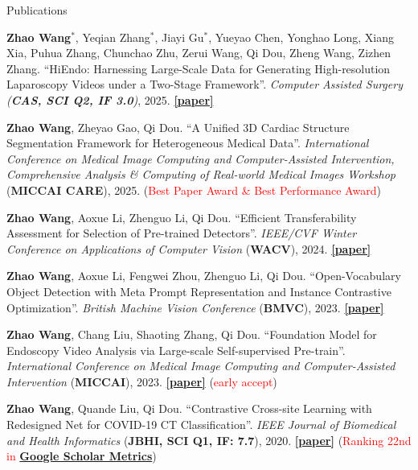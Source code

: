 \documentclass[a4paper]{resume} %
\newcommand{\hl}[1]{\textcolor{red}{#1}}
\begin{document}
\begin{rSection}{Publications}
\begin{enumerate}[label={[\arabic*]}, topsep=0em, leftmargin=1.4em, itemsep=-0.5em]
\item {\bf Zhao Wang}$^*$, Yeqian Zhang$^*$, Jiayi Gu$^*$, Yueyao Chen, Yonghao Long, Xiang Xia, Puhua Zhang, Chunchao Zhu, Zerui Wang, Qi Dou, Zheng Wang, Zizhen Zhang. “HiEndo: Harnessing Large-Scale Data for Generating High-resolution Laparoscopy Videos under a Two-Stage Framework”. {\it Computer Assisted Surgery ({\bf CAS, SCI Q2, IF 3.0})}, 2025. \href{https://www.tandfonline.com/doi/full/10.1080/24699322.2025.2536643}{\bf [paper]}

\item {\bf Zhao Wang},  Zheyao Gao, Qi Dou. “A Unified 3D Cardiac Structure Segmentation Framework for Heterogeneous Medical Data”. {\it International Conference on Medical Image Computing and Computer-Assisted Intervention, Comprehensive Analysis \& Computing of Real-world Medical Images Workshop} ({\bf MICCAI CARE}), 2025.  (\hl{Best Paper Award \& Best Performance Award}) %


\item {\bf Zhao Wang}, Aoxue Li, Zhenguo Li, Qi Dou. “Efficient Transferability Assessment for Selection of Pre-trained Detectors”. {\it IEEE/CVF Winter Conference on Applications of Computer Vision} ({\bf WACV}), 2024. \href{https://arxiv.org/abs/2403.09432}{\bf [paper]}
	
\item {\bf Zhao Wang}, Aoxue Li, Fengwei Zhou, Zhenguo Li, Qi Dou. “Open-Vocabulary Object Detection with Meta Prompt Representation and Instance Contrastive Optimization”. {\it British Machine Vision Conference} ({\bf BMVC}), 2023. \href{https://arxiv.org/abs/2403.09433}{\bf [paper]}

\item {\bf Zhao Wang}, Chang Liu, Shaoting Zhang, Qi Dou. “Foundation Model for Endoscopy Video Analysis via Large-scale Self-supervised Pre-train”. {\it International Conference on Medical Image Computing and Computer-Assisted Intervention} ({\bf MICCAI}), 2023. \href{https://arxiv.org/abs/2306.16741}{\bf [paper]} (\hl{early accept})



\item {\bf Zhao Wang}, Quande Liu, Qi Dou. “Contrastive Cross-site Learning with Redesigned Net for COVID-19 CT Classification”. {\it IEEE Journal of Biomedical and Health Informatics} ({\bf JBHI, SCI Q1, IF: 7.7}), 2020. \href{https://ieeexplore.ieee.org/document/9194240}{\bf [paper]} (\hl{Ranking 22nd in \href{https://scholar.google.com/citations?hl=en\&view\_op=list\_hcore\&venue=L0V86ydYD6YJ.2024\&vq=eng\_medicalinformatics\&cstart=20}{\bf Google Scholar Metrics}})



\end{enumerate}
\end{rSection}
\end{document}
